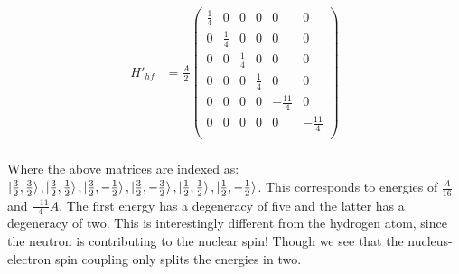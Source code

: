 \documentclass[10pt]{article} %
\begin{document}
\begin{align*}
  H'_{hf} &= \frac{A}{2}
  \begin{pmatrix}
    \frac{1}{4} & 0 & 0 & 0 & 0 & 0\\
    0 & \frac{1}{4} & 0 & 0 & 0 & 0\\
    0 & 0 & \frac{1}{4} & 0 & 0 & 0\\
    0 & 0 & 0 & \frac{1}{4} & 0 & 0\\
    0 & 0 & 0 & 0 & -\frac{11}{4} & 0\\
    0 & 0 & 0 & 0 & 0 & -\frac{11}{4}\\
  \end{pmatrix}\\
\end{align*}

Where the above matrices are indexed as:
$\ket{\frac{3}{2}, \frac{3}{2}},\ket{\frac{3}{2}, \frac{1}{2}},
\ket{\frac{3}{2}, -\frac{1}{2}},\ket{\frac{3}{2}, -\frac{3}{2}},
\ket{\frac{1}{2}, \frac{1}{2}},\ket{\frac{1}{2}, -\frac{1}{2}}$. This corresponds
to energies of $\frac{A}{16}$ and $\frac{-11}{4}A$. The first energy has a
degeneracy of five and the latter has a degeneracy of two. This is interestingly
different from the hydrogen atom, since the neutron is contributing to the nuclear
spin! Though we see that the nucleus-electron spin coupling only splits the energies
in two.\\

\vspace{5cm}
\end{document}
